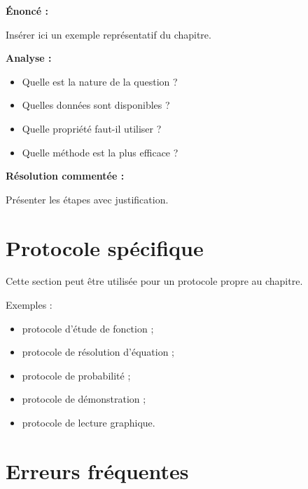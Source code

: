 \documentclass[11pt,a4paper]{article}
\begin{document}
\begin{cadreexemple}
\textbf{Énoncé :}

Insérer ici un exemple représentatif du chapitre.

\medskip

\textbf{Analyse :}
\begin{itemize}
    \item Quelle est la nature de la question ?
    \item Quelles données sont disponibles ?
    \item Quelle propriété faut-il utiliser ?
    \item Quelle méthode est la plus efficace ?
\end{itemize}

\medskip

\textbf{Résolution commentée :}

Présenter les étapes avec justification.
\end{cadreexemple}

\section{Protocole spécifique}

\begin{cadremethode}
Cette section peut être utilisée pour un protocole propre au chapitre.

\medskip

Exemples :
\begin{itemize}
    \item protocole d’étude de fonction ;
    \item protocole de résolution d’équation ;
    \item protocole de probabilité ;
    \item protocole de démonstration ;
    \item protocole de lecture graphique.
\end{itemize}
\end{cadremethode}

\section{Erreurs fréquentes}
\end{document}
